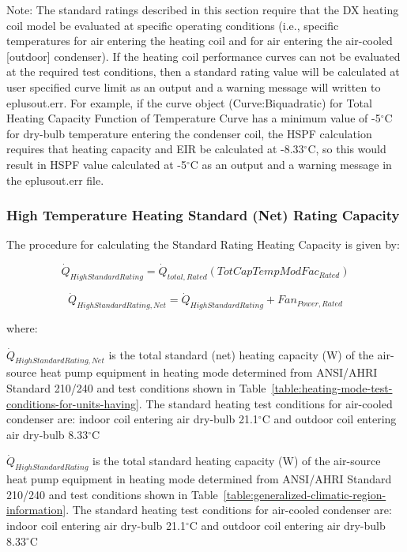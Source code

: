 Note: The standard ratings described in this section require that the DX heating coil model be evaluated at specific operating conditions (i.e., specific temperatures for air entering the heating coil and for air entering the air-cooled {[}outdoor{]} condenser). If the heating coil performance curves can not be evaluated at the required test conditions, then a standard rating value will be calculated at user specified curve limit as an output and a warning message will written to eplusout.err. For example, if the curve object (Curve:Biquadratic) for Total Heating Capacity Function of Temperature Curve has a minimum value of -5\(^{\circ}\)C for dry-bulb temperature entering the condenser coil, the HSPF calculation requires that heating capacity and EIR be calculated at -8.33\(^{\circ}\)C, so this would result in HSPF value calculated at -5\(^{\circ}\)C as an output and a warning message in the eplusout.err file.

\subsubsection{High Temperature Heating Standard (Net) Rating Capacity}\label{high-temperature-heating-standard-net-rating-capacity}

The procedure for calculating the Standard Rating Heating Capacity is given by:

\begin{equation}
{\dot Q_{HighStandardRating}} = {\dot Q_{total,Rated}}\left( {TotCapTempModFa{c_{Rated}}} \right)
\end{equation}

\begin{equation}
{\dot Q_{HighStandardRating,Net}} = {\dot Q_{HighStandardRating}} + Fa{n_{Power,Rated}}
\end{equation}

where:

\({\dot Q_{HighStandardRating,Net}}\) is the total standard (net) heating capacity (W) of the air-source heat pump equipment in heating mode determined from ANSI/AHRI Standard 210/240 and test conditions shown in Table~\ref{table:heating-mode-test-conditions-for-units-having}. The standard heating test conditions for air-cooled condenser are: indoor coil entering air dry-bulb 21.1\(^{\circ}\)C and outdoor coil entering air dry-bulb 8.33\(^{\circ}\)C

\({\dot Q_{HighStandardRating}}\) is the total standard heating capacity (W) of the air-source heat pump equipment in heating mode determined from ANSI/AHRI Standard 210/240 and test conditions shown in Table~\ref{table:generalized-climatic-region-information}. The standard heating test conditions for air-cooled condenser are: indoor coil entering air dry-bulb 21.1\(^{\circ}\)C and outdoor coil entering air dry-bulb 8.33\(^{\circ}\)C

